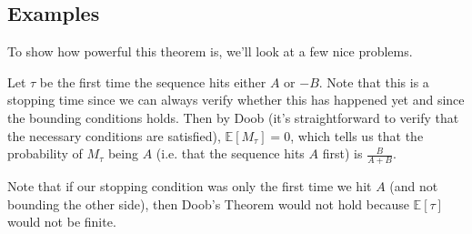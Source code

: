 \documentclass[12pt]{report}
\begin{document}
\subsection{Examples}
\noindent To show how powerful this theorem is, we'll look at a few nice problems.
\begin{solution}
	Let $\tau$ be the first time the sequence hits either $A$ or $-B$. Note that this is a stopping time since we can always verify whether this has happened yet and since the bounding conditions holds. Then by Doob (it's straightforward to verify that the necessary conditions are satisfied), $\mathbb E[M_\tau] = 0$, which tells us that the probability of $M_\tau$ being $A$ (i.e. that the sequence hits $A$ first) is $\frac{B}{A+B}$.
\end{solution}
	Note that if our stopping condition was only the first time we hit $A$ (and not bounding the other side), then Doob's Theorem would not hold because $\mathbb E[\tau]$ would not be finite.

\end{document}
